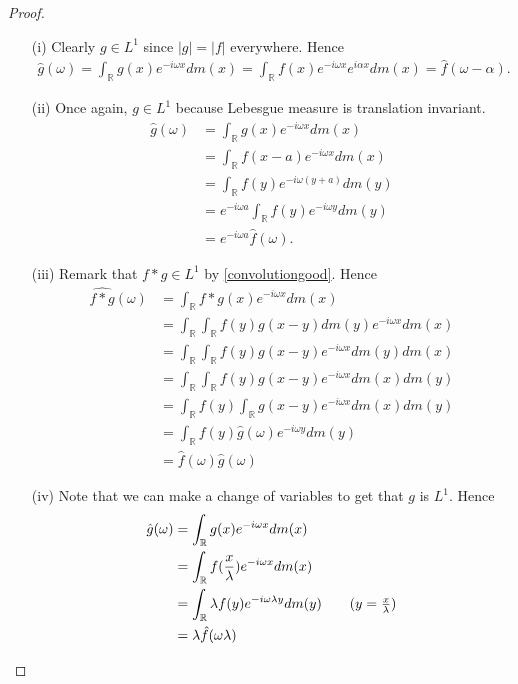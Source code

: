 \documentclass[11pt]{amsart}
\theoremstyle{definition}
\numberwithin{equation}{section}
\begin{document}
\begin{proof}
    \begin{enumerate}
        \item [(i)] Clearly $g\in L^1$ since $|g|=|f|$ everywhere. Hence
        \begin{align*}
            \hat g(\omega)=\int_\mathbb Rg(x)e^{-i\omega x}dm(x)=\int_\mathbb Rf(x)e^{-i\omega x}e^{i\alpha x}dm(x)=\hat f(\omega-\alpha).
        \end{align*}
        \item [(ii)] Once again, $g\in L^1$ because Lebesgue measure is translation invariant.
        \begin{align*}
            \hat g(\omega)&=\int_\mathbb Rg(x)e^{-i\omega x}dm(x)\\
            &=\int_\mathbb Rf(x-a)e^{-i\omega x}dm(x)\\
            &=\int_\mathbb Rf(y)e^{-i\omega(y+a)}dm(y)\\
            &=e^{-i\omega a}\int_\mathbb Rf(y)e^{-i\omega y}dm(y)\\
            &=e^{-i\omega a}\hat f(\omega).
        \end{align*}
        \item [(iii)] Remark that $f*g\in L^1$ by \ref{convolutiongood}. Hence
        \begin{align*}
            \widehat{f*g}(\omega)&=\int_\mathbb Rf*g(x)e^{-i\omega x}dm(x)\\
            &=\int_\mathbb R\int_\mathbb Rf(y)g(x-y)dm(y)e^{-i\omega x}dm(x)\\
            &=\int_\mathbb R\int_\mathbb Rf(y)g(x-y)e^{-i\omega x}dm(y)dm(x)\\
            &=\int_\mathbb R\int_\mathbb Rf(y)g(x-y)e^{-i\omega x}dm(x)dm(y)\\
            &=\int_\mathbb Rf(y)\int_\mathbb Rg(x-y)e^{-i\omega x}dm(x)dm(y)\\
            &=\int_\mathbb Rf(y)\hat g(\omega)e^{-i\omega y}dm(y)\\
            &=\hat f(\omega)\hat g(\omega)
        \end{align*}
        \item [(iv)] Note that we can make a change of variables to get that $g$ is $L^1$. Hence
        \begin{align*}
            \hat g(\omega)&=\int_\mathbb Rg(x)e^{-i\omega x}dm(x)\\
            &=\int_\mathbb Rf(\frac{x}{\lambda})e^{-i\omega x}dm(x)\\
            &=\int_\mathbb R\lambda f(y)e^{-i\omega\lambda y}dm(y)\tag{$y=\frac{x}{\lambda}$}\\
            &=\lambda\hat f(\omega\lambda)
        \end{align*}
    \end{enumerate}
\end{proof}
\end{document}
